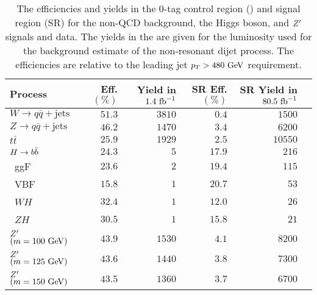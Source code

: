 \begin{table}[htpb]
 \centering
 \caption[Efficiencies and yields of resonant backgrounds and the signal processes.]{%
  The efficiencies and yields in the $0$-tag control region (\CRQCD{}) and signal region (SR) for the non-QCD background, the Higgs boson, and $Z'$ signals and data.
  The yields in the \CRQCD{} are given for the luminosity used for the background estimate of the non-resonant dijet process.
  The efficiencies are relative to the leading \largeR{} jet $p_{T} > 480~\mathrm{GeV}$ requirement.}
 \begin{tabular}{@{}lrrrrr@{}}
  \toprule
  Process                             & \CRQCD{} Eff. $(\%)$ & \CRQCD{} Yield in $1.4~\mathrm{fb}^{-1}$ & SR Eff. $(\%)$ & SR Yield in $80.5~\mathrm{fb}^{-1}$ \\ \midrule
  $W \to q\bar{q} + \mathrm{jets}$    & $51.3$               & $3810$                       & $0.4$          & $1500$                  \\
  $Z \to q\bar{q} + \mathrm{jets}$    & $46.2$               & $1470$                       & $3.4$          & $6200$                  \\
  $t\bar{t}$                          & $25.9$               & $1929$                       & $2.5$          & $10550$                 \\
  $\Hbb$                              & $24.3$               & $5$                          & $17.9$         & $216$                   \\
  \phantom{$\Hbb$\quad}~ggF           & $23.6$               & $2$                          & $19.4$         & $115$                   \\
  \phantom{$\Hbb$\quad}~VBF           & $15.8$               & $1$                          & $20.7$         & $53$                    \\
  \phantom{$\Hbb$\quad}~$WH$          & $32.4$               & $1$                          & $12.0$         & $26$                    \\
  \phantom{$\Hbb$\quad}~$ZH$          & $30.5$               & $1$                          & $15.8$         & $21$                    \\
  $Z'$ $\left(m=100~\mathrm{GeV}\right)$ & $43.9$               & $1530$                       & $4.1$          & $8200$                  \\
  $Z'$ $\left(m=125~\mathrm{GeV}\right)$ & $43.6$               & $1440$                       & $3.8$          & $7300$                  \\
  $Z'$ $\left(m=150~\mathrm{GeV}\right)$ & $43.5$               & $1360$                       & $3.7$          & $6700$                  \\

\end{tabular}
\end{table}
